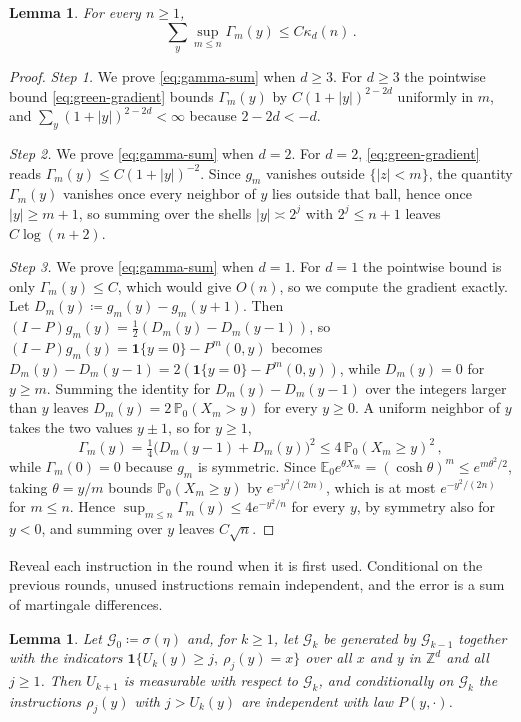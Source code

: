 \documentclass[11pt]{amsart}
\theoremstyle{plain}
\newtheorem{lemma}[theorem]{Lemma}
\theoremstyle{definition}
\newcommand{\Z}{\mathbb{Z}}
\newcommand{\E}{\mathbb{E}}
\renewcommand{\P}{\mathbb{P}}
\newcommand{\one}{\mathbf{1}}
\begin{document}
\begin{lemma}\label{lem:gamma-sum}
	For every $n\geq1$,
	\begin{equation}\label{eq:gamma-sum}
		\sum_y\sup_{m\leq n}\Gamma_m(y)\leq C\kappa_d(n)\,.
	\end{equation}
\end{lemma}

\begin{proof}
	\smallskip
	\noindent\emph{Step 1.} We prove \eqref{eq:gamma-sum} when $d\geq3$.
	For $d\geq3$ the pointwise bound \eqref{eq:green-gradient} bounds
	$\Gamma_m(y)$ by $C(1+|y|)^{2-2d}$ uniformly in $m$, and
	$\sum_y(1+|y|)^{2-2d}<\infty$ because $2-2d<-d$.

	\smallskip
	\noindent\emph{Step 2.} We prove \eqref{eq:gamma-sum} when $d=2$.
	For $d=2$, \eqref{eq:green-gradient}
	reads $\Gamma_m(y)\leq C(1+|y|)^{-2}$. Since $g_m$ vanishes outside
	$\{|z|<m\}$, the quantity $\Gamma_m(y)$ vanishes once every neighbor of $y$
	lies outside that ball, hence once $|y|\geq m+1$, so summing over the shells
	$|y|\asymp2^j$ with $2^j\leq n+1$ leaves $C\log(n+2)$.

	\smallskip
	\noindent\emph{Step 3.} We prove \eqref{eq:gamma-sum} when $d=1$.
	For $d=1$ the pointwise bound is only $\Gamma_m(y)\leq C$, which would give
	$O(n)$, so we compute the gradient exactly. Let
	$D_m(y)\coloneqq g_m(y)-g_m(y+1)$.
	Then $(I-P)g_m(y)=\tfrac12(D_m(y)-D_m(y-1))$, so
	$(I-P)g_m(y)=\one\{y=0\}-P^m(0,y)$ becomes
	$D_m(y)-D_m(y-1)=2(\one\{y=0\}-P^m(0,y))$, while $D_m(y)=0$ for $y\geq m$.
	Summing the identity for $D_m(y)-D_m(y-1)$ over the integers larger than $y$
	leaves
	$D_m(y)=2\,\P_0(X_m>y)$ for every $y\geq0$. A uniform neighbor of $y$ takes
	the two values $y\pm1$, so for $y\geq1$,
	\[
		\Gamma_m(y)=\tfrac14\bigl(D_m(y-1)+D_m(y)\bigr)^2
		\leq4\,\P_0(X_m\geq y)^2\,,
	\]
	while $\Gamma_m(0)=0$ because $g_m$ is symmetric. Since
	$\E_0e^{\theta X_m}=(\cosh\theta)^m\leq e^{m\theta^2/2}$, taking
	$\theta=y/m$ bounds $\P_0(X_m\geq y)$ by $e^{-y^2/(2m)}$, which is at most
	$e^{-y^2/(2n)}$ for $m\leq n$. Hence $\sup_{m\leq n}\Gamma_m(y)\leq
	4e^{-y^2/n}$ for every $y$, by symmetry also for $y<0$, and summing over $y$
	leaves $C\sqrt n$.
\end{proof}

Reveal each instruction in the round when it is first used. Conditional on
the previous rounds, unused instructions remain independent, and the error is a
sum of martingale differences.

\begin{lemma}\label{lem:exposure}
	Let $\mathcal G_0\coloneqq\sigma(\eta)$ and, for $k\geq1$, let $\mathcal G_k$ be
	generated by $\mathcal G_{k-1}$ together with the indicators
	$\one\{U_k(y)\geq j,\ \rho_j(y)=x\}$ over all $x$ and $y$ in $\Z^d$ and all
	$j\geq1$. Then
	$U_{k+1}$ is measurable with respect to $\mathcal G_k$, and conditionally on
	$\mathcal G_k$ the instructions $\rho_j(y)$ with $j>U_k(y)$ are independent
	with law $P(y,\cdot)$.
\end{lemma}
\end{document}
